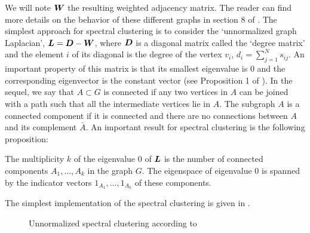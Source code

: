 We will note $\boldsymbol W$ the resulting weighted adjacency matrix. The reader can find more details on the behavior of these different graphs in section 8 of \citep{Luxburg:2007:TSC:1288822.1288832}. The simplest approach for spectral clustering is to consider the `unnormalized graph Laplacian', $\boldsymbol L=\boldsymbol D-\boldsymbol W$, where $\boldsymbol D$ is a diagonal matrix called the `degree matrix' and the element $i$ of its diagonal is the degree of the vertex $v_i$, $d_i= \sum_{j=1}^Ns_{ij}$. An important property of this matrix is that its smallest eigenvalue is 0 and the corresponding eigenvector is the constant vector (see Proposition 1 of \citep{Luxburg:2007:TSC:1288822.1288832}). In the sequel, we say that $A \subset G$ is connected if any two vertices in $A$ can be joined with a path such that all the intermediate vertices lie in $A$. The subgraph $A$ is a connected component if it is connected and there are no connections between $A$ and its complement $\bar A$. An important result for spectral clustering is the following proposition:
\begin{proposition}
 The multiplicity $k$ of the eigenvalue 0 of $\boldsymbol L$ is the number of connected components $A_1,\dots,A_k$ in the graph $G$. The eigenspace of eigenvalue 0 is spanned by the indicator vectors $1_{A_1},\dots,1_{A_k}$ of these components.
 \end{proposition}
 The simplest implementation of the spectral clustering is given in .
 \begin{figure}[h]
\begin{center}
   \caption{Unnormalized spectral clustering according to \citep{Luxburg:2007:TSC:1288822.1288832}}
   \label{algo:unnorm_spectr_alg}
\end{center}
\vspace{-15pt}
\end{figure}
